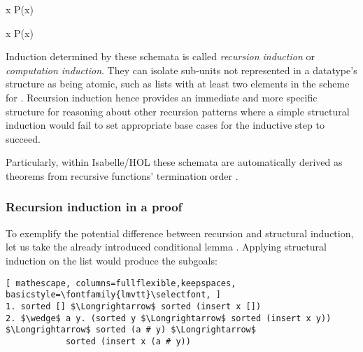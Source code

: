 \vspace{2 mm}

  {\forall x \;\; P\;(x)}

  {\forall x \;\; P\;(x)}

\vspace{2 mm}


Induction determined by these schemata is called \emph{recursion induction} or \emph{computation induction}.
%
They can isolate sub-units not represented in a datatype's structure as being atomic, such as lists with at least two elements in the scheme for .
%
Recursion induction hence provides an immediate and more specific structure for reasoning about other recursion patterns where a simple structural induction would fail to set appropriate base cases for the inductive step to succeed.

Particularly, within Isabelle/HOL these schemata are automatically derived as theorems from recursive functions' termination order \cite{krauss-term}. %

\subsubsection*{Recursion induction in a proof}


To exemplify the potential difference between recursion and structural induction, let us take the already introduced conditional lemma .
%
Applying structural induction on the list  would produce the subgoals:

\begin{lstlisting}[ mathescape, columns=fullflexible,keepspaces, basicstyle=\fontfamily{lmvtt}\selectfont, ]
1. sorted [] $\Longrightarrow$ sorted (insert x [])
2. $\wedge$ a y. (sorted y $\Longrightarrow$ sorted (insert x y)) $\Longrightarrow$ sorted (a # y) $\Longrightarrow$
            sorted (insert x (a # y))
\end{lstlisting}

